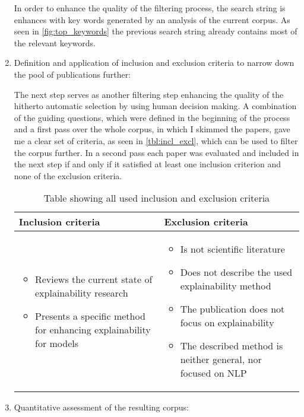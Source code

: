 \begin{enumerate}
	In order to enhance the quality of the filtering process, the search string is enhances with key words generated by an analysis of the current corpus. As seen in \autoref{fig:top_keywords} the previous search string already contains most of the relevant keywords.
	
	\item Definition and application of inclusion and exclusion criteria to narrow down the pool of publications further:
	
	The next step serves as another filtering step enhancing the quality of the hitherto automatic selection by using human decision making. A combination of the guiding questions, which were defined in the beginning of the process and a first pass over the whole corpus, in which I skimmed the papers, gave me a clear set of criteria, as seen in \autoref{tbl:incl_excl}, which can be used to filter the corpus further. In a second pass each paper was evaluated and included in the next step if and only if it satisfied at least one inclusion criterion and none of the exclusion criteria.	
	
	\begin{table}
		\centering
		\begin{tabular}{  p{5cm} | p{5cm} }
			Inclusion criteria & Exclusion criteria  \\ \hline
			
			\begin{itemize}
				\item Reviews the current state of explainability research
				\item Presents a specific method for enhancing explainability for models
			\end{itemize}
			
			&
			
			\begin{itemize}
				\item Is not scientific literature
				\item Does not describe the used explainability method
				\item The publication does not focus on explainability
				\item The described method is neither general, nor focused on NLP
			\end{itemize}
		\end{tabular}
		\caption{\label{tbl:incl_excl} Table showing all used inclusion and exclusion criteria}
	\end{table}
	
	\item Quantitative assessment of the resulting corpus:
	

\end{enumerate}

